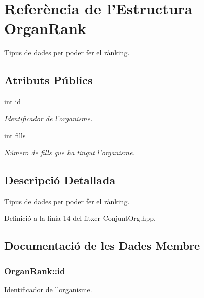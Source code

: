 \hypertarget{struct_organ_rank}{\section{Referència de l'Estructura Organ\-Rank}
\label{struct_organ_rank}
}


Tipus de dades per poder fer el rànking.  


\subsection*{Atributs Públics}
\begin{DoxyCompactItemize}
\item 
int \hyperlink{struct_organ_rank_a4c2294bdeab2be3ce7e6142687a0542c}{id}
\begin{DoxyCompactList}\small\item\em Identificador de l'organisme. \end{DoxyCompactList}\item 
int \hyperlink{struct_organ_rank_ac822919ccf32979e8c4d8384a1949b08}{fills}
\begin{DoxyCompactList}\small\item\em Número de fills que ha tingut l'organisme. \end{DoxyCompactList}\end{DoxyCompactItemize}


\subsection{Descripció Detallada}
Tipus de dades per poder fer el rànking. 

Definició a la línia 14 del fitxer Conjunt\-Org.\-hpp.



\subsection{Documentació de les Dades Membre}
\hypertarget{struct_organ_rank_a4c2294bdeab2be3ce7e6142687a0542c}{
\subsubsection[{id}]{\setlength{\rightskip}{0pt plus 5cm}Organ\-Rank\-::id}}\label{struct_organ_rank_a4c2294bdeab2be3ce7e6142687a0542c}


Identificador de l'organisme. 



